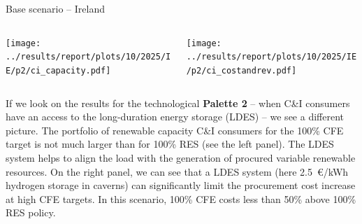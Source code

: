 \begin{frame}{Base scenario -- Ireland}

    {\footnotesize
  
    \begin{columns}
    \begin{column}{7cm}
    \centering
    \texttt{[image: ../results/report/plots/10/2025/IE/p2/ci\_capacity.pdf]}
    \end{column}
  
    \begin{column}{8cm}
    \centering
    \texttt{[image: ../results/report/plots/10/2025/IE/p2/ci\_costandrev.pdf]}
    \end{column}
  
    \end{columns}
  
    \begin{columns}
    \begin{column}{15cm}
    If we look on the results for the technological {\bf Palette 2} -- 
    when C\&I consumers have an access to the long-duration energy storage (LDES) --
    we see a different picture. The portfolio of renewable capacity 
    C\&I consumers for the 100\% CFE target is not much larger 
    than for 100\% RES (see the left panel). The LDES system helps to align the load 
    with the generation of procured variable renewable resources. 
    On the right panel, we can see that a LDES system (here 2.5~€/kWh 
    hydrogen storage in caverns) can \alert{significantly limit the procurement cost
    increase} at high CFE targets. In this scenario, 100\% CFE costs less than 50\% above 
    100\% RES policy.

    \end{column}
    \end{columns}
    }
  
\end{frame}



